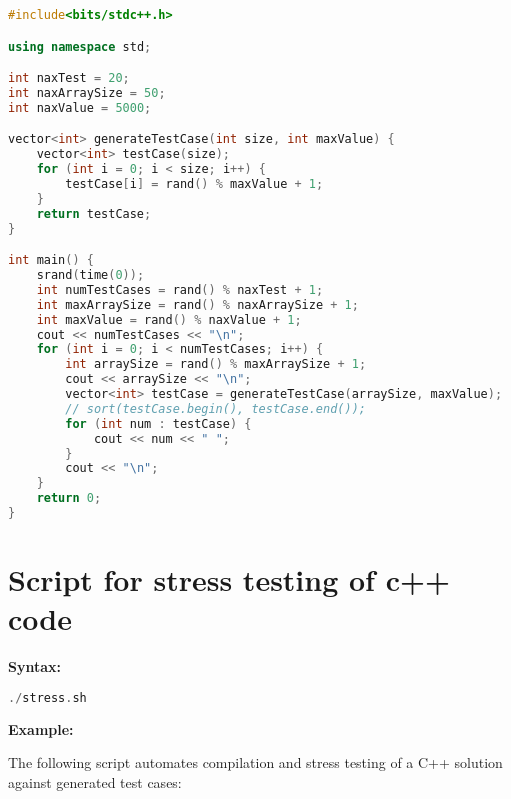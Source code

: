 \begin{lstlisting}[language=C++, caption={Test case generator}]
#include<bits/stdc++.h>

using namespace std;

int naxTest = 20;
int naxArraySize = 50;
int naxValue = 5000;

vector<int> generateTestCase(int size, int maxValue) {
    vector<int> testCase(size);
    for (int i = 0; i < size; i++) {
        testCase[i] = rand() % maxValue + 1;
    }
    return testCase;
}

int main() {
    srand(time(0));
    int numTestCases = rand() % naxTest + 1;
    int maxArraySize = rand() % naxArraySize + 1;
    int maxValue = rand() % naxValue + 1;
    cout << numTestCases << "\n";
    for (int i = 0; i < numTestCases; i++) {
        int arraySize = rand() % maxArraySize + 1;
        cout << arraySize << "\n";
        vector<int> testCase = generateTestCase(arraySize, maxValue);
        // sort(testCase.begin(), testCase.end());
        for (int num : testCase) {
            cout << num << " ";
        }
        cout << "\n";
    }
    return 0;
}
\end{lstlisting}

\section{Script for stress testing of c++ code}

\textbf{Syntax:}
\begin{lstlisting}[language=C++]
./stress.sh
\end{lstlisting}

\textbf{Example:}

The following script automates compilation and stress testing of a C++ solution against generated test cases:

